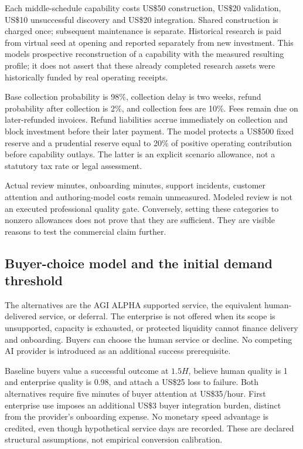 \documentclass[11pt,letterpaper]{article}
\newcommand{\usd}[1]{US\$#1}
\begin{document}
Each middle-schedule capability costs \usd{50} construction, \usd{20} validation, \usd{10} unsuccessful discovery and \usd{20} integration. Shared construction is charged once; subsequent maintenance is separate. Historical research is paid from virtual seed at opening and reported separately from new investment. This models prospective reconstruction of a capability with the measured resulting profile; it does not assert that these already completed research assets were historically funded by real operating receipts.

Base collection probability is 98\%, collection delay is two weeks, refund probability after collection is 2\%, and collection fees are 10\%. Fees remain due on later-refunded invoices. Refund liabilities accrue immediately on collection and block investment before their later payment. The model protects a \usd{500} fixed reserve and a prudential reserve equal to 20\% of positive operating contribution before capability outlays. The latter is an explicit scenario allowance, not a statutory tax rate or legal assessment.

Actual review minutes, onboarding minutes, support incidents, customer attention and authoring-model costs remain unmeasured. Modeled review is not an executed professional quality gate. Conversely, setting these categories to nonzero allowances does not prove that they are sufficient. They are visible reasons to test the commercial claim further.

\subsection{Buyer-choice model and the initial demand threshold}
The alternatives are the AGI ALPHA supported service, the equivalent human-delivered service, or deferral. The enterprise is not offered when its scope is unsupported, capacity is exhausted, or protected liquidity cannot finance delivery and onboarding. Buyers can choose the human service or decline. No competing AI provider is introduced as an additional success prerequisite.

Baseline buyers value a successful outcome at $1.5H$, believe human quality is 1 and enterprise quality is 0.98, and attach a \usd{25} loss to failure. Both alternatives require five minutes of buyer attention at \usd{35}/hour. First enterprise use imposes an additional \usd{3} buyer integration burden, distinct from the provider's onboarding expense. No monetary speed advantage is credited, even though hypothetical service days are recorded. These are declared structural assumptions, not empirical conversion calibration.
\end{document}
